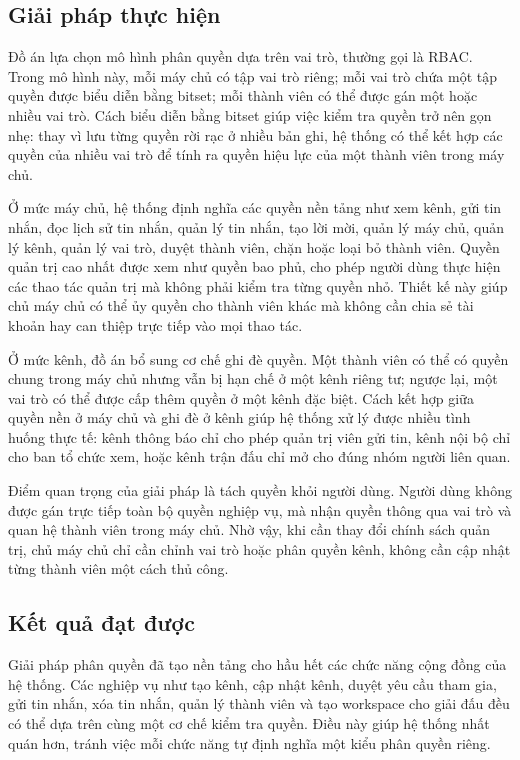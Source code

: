 \subsection{Giải pháp thực hiện}
\label{subsection:5.1.2}

Đồ án lựa chọn mô hình phân quyền dựa trên vai trò, thường gọi là RBAC. Trong mô hình này, mỗi máy chủ có tập vai trò riêng; mỗi vai trò chứa một tập quyền được biểu diễn bằng bitset; mỗi thành viên có thể được gán một hoặc nhiều vai trò. Cách biểu diễn bằng bitset giúp việc kiểm tra quyền trở nên gọn nhẹ: thay vì lưu từng quyền rời rạc ở nhiều bản ghi, hệ thống có thể kết hợp các quyền của nhiều vai trò để tính ra quyền hiệu lực của một thành viên trong máy chủ.

Ở mức máy chủ, hệ thống định nghĩa các quyền nền tảng như xem kênh, gửi tin nhắn, đọc lịch sử tin nhắn, quản lý tin nhắn, tạo lời mời, quản lý máy chủ, quản lý kênh, quản lý vai trò, duyệt thành viên, chặn hoặc loại bỏ thành viên. Quyền quản trị cao nhất được xem như quyền bao phủ, cho phép người dùng thực hiện các thao tác quản trị mà không phải kiểm tra từng quyền nhỏ. Thiết kế này giúp chủ máy chủ có thể ủy quyền cho thành viên khác mà không cần chia sẻ tài khoản hay can thiệp trực tiếp vào mọi thao tác.

Ở mức kênh, đồ án bổ sung cơ chế ghi đè quyền. Một thành viên có thể có quyền chung trong máy chủ nhưng vẫn bị hạn chế ở một kênh riêng tư; ngược lại, một vai trò có thể được cấp thêm quyền ở một kênh đặc biệt. Cách kết hợp giữa quyền nền ở máy chủ và ghi đè ở kênh giúp hệ thống xử lý được nhiều tình huống thực tế: kênh thông báo chỉ cho phép quản trị viên gửi tin, kênh nội bộ chỉ cho ban tổ chức xem, hoặc kênh trận đấu chỉ mở cho đúng nhóm người liên quan.

Điểm quan trọng của giải pháp là tách quyền khỏi người dùng. Người dùng không được gán trực tiếp toàn bộ quyền nghiệp vụ, mà nhận quyền thông qua vai trò và quan hệ thành viên trong máy chủ. Nhờ vậy, khi cần thay đổi chính sách quản trị, chủ máy chủ chỉ cần chỉnh vai trò hoặc phân quyền kênh, không cần cập nhật từng thành viên một cách thủ công.

\subsection{Kết quả đạt được}
\label{subsection:5.1.3}

Giải pháp phân quyền đã tạo nền tảng cho hầu hết các chức năng cộng đồng của hệ thống. Các nghiệp vụ như tạo kênh, cập nhật kênh, duyệt yêu cầu tham gia, gửi tin nhắn, xóa tin nhắn, quản lý thành viên và tạo workspace cho giải đấu đều có thể dựa trên cùng một cơ chế kiểm tra quyền. Điều này giúp hệ thống nhất quán hơn, tránh việc mỗi chức năng tự định nghĩa một kiểu phân quyền riêng.

